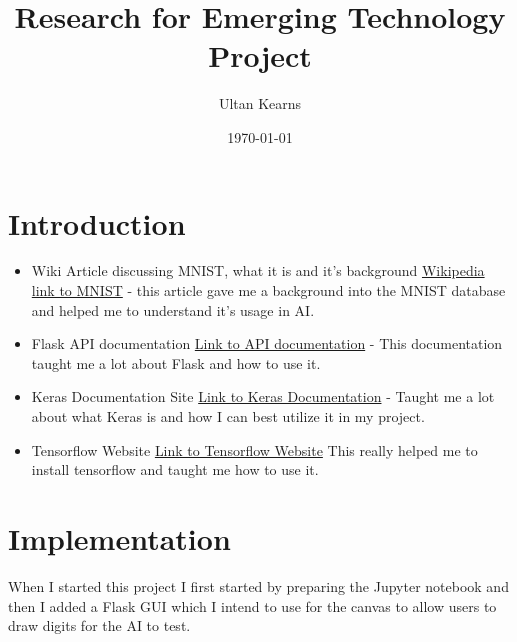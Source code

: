 \documentclass[12pt, letterpaper]{article}
\title{Research for Emerging Technology Project}
\author{Ultan Kearns}
\date{\today}
\begin{document}
\begin{titlepage}
\maketitle
\end{titlepage}
\tableofcontents
\newpage
\section{Introduction}
\begin{itemize}
\item Wiki Article discussing MNIST, what it is and it's background
\href{https://en.wikipedia.org/wiki/MNIST_database}{Wikipedia link to MNIST} -
this article gave me a background into the MNIST database and helped me to understand
it's usage in AI.
\item Flask API documentation \href{https://flask.palletsprojects.com/en/1.1.x/}{Link to API documentation} - This documentation taught me a lot about Flask and how to use it.
\item Keras Documentation Site \href{https://keras.io/}{Link to Keras Documentation} - Taught me a lot about what Keras is and how I can best utilize it in my project.
\item Tensorflow Website \href{https://www.tensorflow.org/}{Link to Tensorflow Website} This really helped me to install tensorflow and taught me how to use it.
\end{itemize}
\section{Implementation}
When I started this project I first started by preparing the Jupyter notebook and then I added a Flask GUI which
I intend to use for the canvas to allow users to draw digits for the AI to test.
\end{document}
